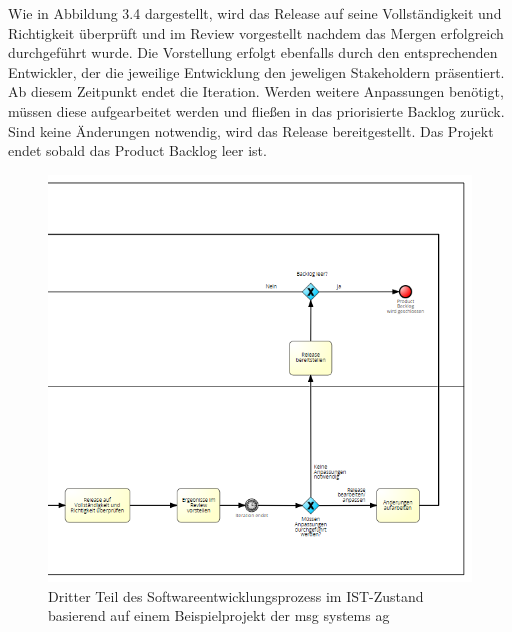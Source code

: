 Wie in Abbildung 3.4 dargestellt, wird das Release auf seine Vollständigkeit und Richtigkeit überprüft und im Review vorgestellt nachdem das Mergen erfolgreich durchgeführt wurde. Die Vorstellung erfolgt ebenfalls durch den entsprechenden Entwickler, der die jeweilige Entwicklung den jeweligen Stakeholdern präsentiert. Ab diesem Zeitpunkt endet die Iteration. Werden weitere Anpassungen benötigt, müssen diese aufgearbeitet werden und fließen in das priorisierte Backlog zurück. Sind keine Änderungen notwendig, wird das Release bereitgestellt. Das Projekt endet sobald das Product Backlog leer ist.

\begin{figure}[h]
    \centering
    \includegraphics[scale=0.5]{Bilder/IST-Prozess_third Part.png}
    \caption{Dritter Teil des Softwareentwicklungsprozess im IST-Zustand basierend auf einem Beispielprojekt der msg systems ag}
\end{figure}





